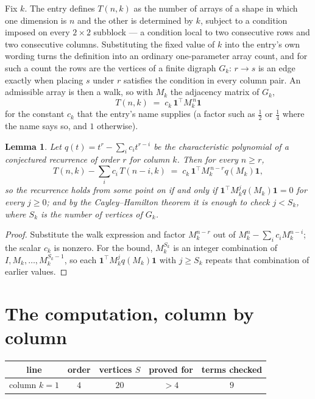 \documentclass[11pt,a4paper]{article}
\theoremstyle{plain}
\newtheorem{lemma}[theorem]{Lemma}
\theoremstyle{definition}
\begin{document}
Fix $k$. The entry defines $T(n,k)$ as the number of arrays of a shape in which one dimension
is $n$ and the other is determined by $k$, subject to a condition imposed on every
$2\times2$ subblock --- a condition local to two consecutive rows and two consecutive columns.
Substituting the fixed value of $k$ into the entry's own wording turns the definition into an
ordinary one-parameter array count, and for such a count the rows are the vertices of a finite
digraph $G_k$: $r\to s$ is an edge exactly when placing $s$ under $r$ satisfies the condition
in every column pair. An admissible array is then a walk, so with $M_k$ the adjacency matrix
of $G_k$,
\[
T(n,k)\;=\;c_k\,\mathbf{1}^{\!\top}M_k^{\,n}\mathbf{1}
\]
for the constant $c_k$ that the entry's name supplies (a factor such as $\tfrac12$ or
$\tfrac14$ where the name says so, and $1$ otherwise).

\begin{lemma}\label{lem:crit}
Let $q(t)=t^{r}-\sum_i c_it^{r-i}$ be the characteristic polynomial of a conjectured
recurrence of order $r$ for column $k$. Then for every $n\ge r$,
\[
T(n,k)-\sum_i c_i\,T(n-i,k)\;=\;c_k\,\mathbf{1}^{\!\top}M_k^{\,n-r}q(M_k)\mathbf{1},
\]
so the recurrence holds from some point on if and only if
$\mathbf{1}^{\!\top}M_k^{j}q(M_k)\mathbf{1}=0$ for every $j\ge0$; and by the
Cayley--Hamilton theorem it is enough to check $j<S_k$, where $S_k$ is the number of vertices
of $G_k$.
\end{lemma}

\begin{proof}
Substitute the walk expression and factor $M_k^{n-r}$ out of $M_k^{n}-\sum_ic_iM_k^{n-i}$;
the scalar $c_k$ is nonzero. For the bound, $M_k^{S_k}$ is an integer combination of
$I,M_k,\dots,M_k^{S_k-1}$, so each $\mathbf{1}^{\!\top}M_k^{j}q(M_k)\mathbf{1}$ with
$j\ge S_k$ repeats that combination of earlier values.
\end{proof}

\section{The computation, column by column}

\begin{center}
\begin{tabular}{ccccc}
line & order & vertices $S$ & proved for & terms checked \\ \hline
column $k$$=1$ & $4$ & $20$ & $>4$ & $9$ \\
\end{tabular}
\end{center}
\end{document}
